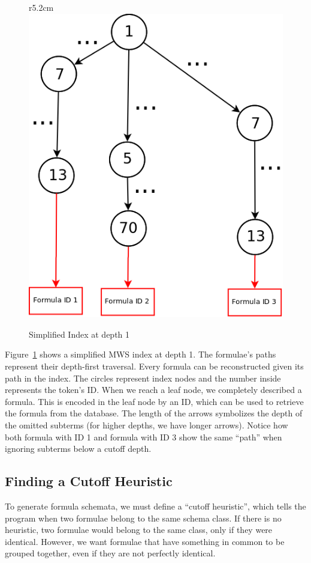 \documentclass[a4paper,oneside]{article}
\def\MWS{\textsf{MWS}\xspace}
\begin{document}
\begin{figure}r{5.2cm}\vspace*{-1em}
    \includegraphics[scale=0.21]{img/FFG_Algo_diag.png}
\caption{Simplified Index at depth 1}\label{fig:algoindex}
\end{figure}

Figure~\ref{fig:algoindex} shows a simplified \MWS index at depth 1.
The formulae's paths represent their depth-first traversal.
Every formula can be reconstructed given its path in the index.
The circles represent index nodes and the number inside represents
the token's ID. When we reach a leaf node, we completely described a
formula. This is encoded in the leaf node by an ID, which can be used
to retrieve the formula from the database.
The length of the arrows symbolizes the depth of the omitted subterms
(for higher depths, we have longer arrows).
Notice how both formula with ID 1 and formula with ID 3 show the same
``path'' when ignoring subterms below a cutoff depth.

\subsection{Finding a Cutoff Heuristic}\label{subsec:cutoffheur}
To generate formula schemata, we must define a ``cutoff heuristic'',
which tells the program when two formulae belong to the same schema class.
If there is no heuristic, two formulae would belong to the same class,
only if they were identical. However, we want formulae that have something in
common to be grouped together, even if they are not perfectly identical.
\end{document}

